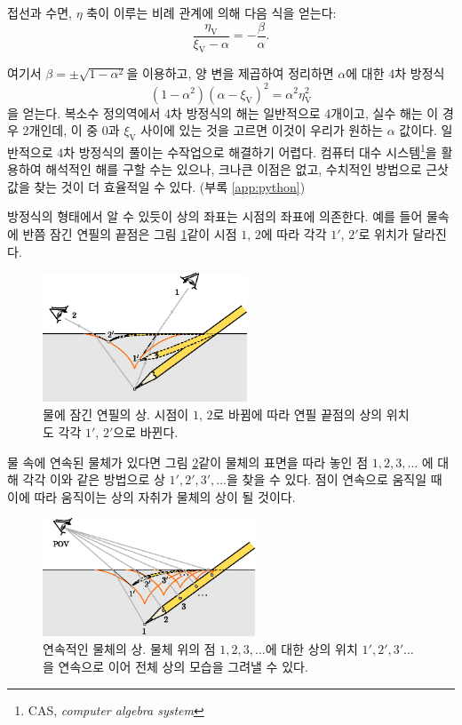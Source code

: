 \documentclass[twocolumn]{article}
\begin{document}
접선과 수면, $\eta$ 축이 이루는 비례 관계에 의해 다음 식을 얻는다:
$$\dfrac{\eta_{\mathrm{V}}^{}}{\xi_{\mathrm{V}}^{}-\alpha}=-\dfrac{\beta}{\alpha}.$$

여기서 $\beta = \pm \sqrt{1-\alpha^2}$을 이용하고, 양 변을 제곱하여 정리하면 $\alpha$에 대한 4차 방정식
\[
\left( 1 - \alpha^2 \right) \left(\alpha-\xi_{\mathrm{V}} \right)^2 = \alpha^2 \eta_{\mathrm{V}}^2
\]
을 얻는다. 복소수 정의역에서 4차 방정식의 해는 일반적으로 4개이고, 실수 해는 이 경우 2개인데, 이 중 $0$과 $\xi_{\mathrm{V}}$ 사이에 있는 것을 고르면 이것이 우리가 원하는 $\alpha$ 값이다. 일반적으로 4차 방정식의 풀이는 수작업으로 해결하기 어렵다. 컴퓨터 대수 시스템\footnote{CAS, \emph{computer algebra system}}을 활용하여 해석적인 해를 구할 수는 있으나, 크나큰 이점은 없고, 수치적인 방법으로 근삿값을 찾는 것이 더 효율적일 수 있다. (부록 \ref{app:python})

방정식의 형태에서 알 수 있듯이 상의 좌표는 시점의 좌표에 의존한다. 예를 들어 물속에 반쯤 잠긴 연필의 끝점은 그림 \ref{fig:pencil_view}\와 같이 시점 $1$, $2$에 따라 각각 $1'$, $2'$로 위치가 달라진다.

\begin{figure}[h]
	\centering
	\includegraphics[width=2.4in]{figs/g43.eps}
	\caption{물에 잠긴 연필의 상. 시점이 $1$, $2$로 바뀜에 따라 연필 끝점의 상의 위치도 각각 $1'$, $2'$으로 바뀐다.}
	\label{fig:pencil_view}
\end{figure}

물 속에 연속된 물체가 있다면 그림 \ref{fig:extended_image}\와 같이 물체의 표면을 따라 놓인 점 $1, 2, 3, \dots$ 에 대해
각각 이와 같은 방법으로 상 $1', 2', 3', \dots$을 찾을 수 있다. 점이 연속으로 움직일 때 이에 따라 움직이는 상의 자취가 
물체의 상이 될 것이다.

\begin{figure}[h]
	\centering
	\includegraphics*[width=2.5in]{figs/g242.eps}
	\caption{연속적인 물체의 상. 물체 위의 점 $1, 2, 3, \dots$에 대한 상의 위치 $1', 2', 3' \dots$을 연속으로 이어 전체 상의 모습을 그려낼 수 있다.}
	\label{fig:extended_image}
\end{figure}
\end{document}
